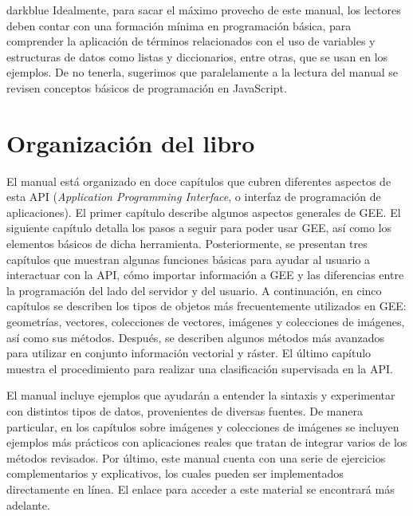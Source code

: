 \documentclass[
  12pt,
  letterpaper,
  twoside]{book}
\begin{document}
\begin{bluebox2}

\begin{awesomeblock}{5pt}{\faLightbulb}{darkblue}
Idealmente, para sacar el máximo provecho de este manual, los lectores deben contar con una formación mínima en programación básica, para comprender la aplicación de términos relacionados con el uso de variables y estructuras de datos como listas y diccionarios, entre otras, que se usan en los ejemplos. De no tenerla, sugerimos que paralelamente a la lectura del manual se revisen conceptos básicos de programación en JavaScript.

\end{awesomeblock}

\end{bluebox2}

\hypertarget{organizaciuxf3n-del-libro}{%
\section{Organización del libro}\label{organizaciuxf3n-del-libro}}

El manual está organizado en doce capítulos que cubren diferentes aspectos de esta API (\emph{Application Programming Interface}, o interfaz de programación de aplicaciones). El primer capítulo describe algunos aspectos generales de GEE. El siguiente capítulo detalla los pasos a seguir para poder usar GEE, así como los elementos básicos de dicha herramienta. Posteriormente, se presentan tres capítulos que muestran algunas funciones básicas para ayudar al usuario a interactuar con la API, cómo importar información a GEE y las diferencias entre la programación del lado del servidor y del usuario. A continuación, en cinco capítulos se describen los tipos de objetos más frecuentemente utilizados en GEE: geometrías, vectores, colecciones de vectores, imágenes y colecciones de imágenes, así como sus métodos. Después, se describen algunos métodos más avanzados para utilizar en conjunto información vectorial y ráster. El último capítulo muestra el procedimiento para realizar una clasificación supervisada en la API.

El manual incluye ejemplos que ayudarán a entender la sintaxis y experimentar con distintos tipos de datos, provenientes de diversas fuentes. De manera particular, en los capítulos sobre imágenes y colecciones de imágenes se incluyen ejemplos más prácticos con aplicaciones reales que tratan de integrar varios de los métodos revisados. Por último, este manual cuenta con una serie de ejercicios complementarios y explicativos, los cuales pueden ser implementados directamente en línea. El enlace para acceder a este material se encontrará más adelante.
\end{document}
